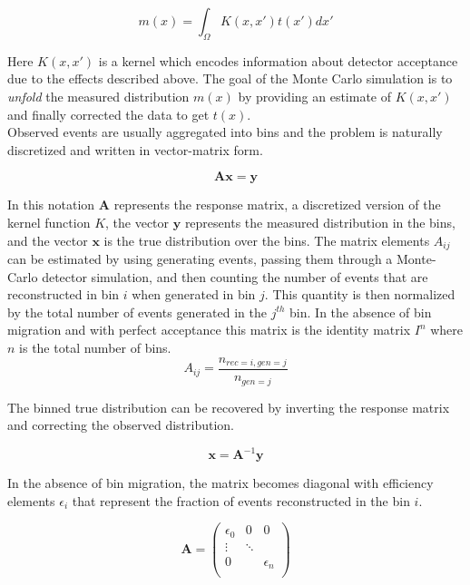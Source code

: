\begin{equation}
	m(x) = \int_{\Omega} K(x,x') t(x') dx'
\end{equation}
    
Here $K(x,x')$ is a kernel which encodes information about detector acceptance due to the effects described above.  The goal of the Monte Carlo simulation is to \textit{unfold} the measured distribution $m(x)$ by providing an estimate of $K(x,x')$ and finally corrected the data to get $t(x)$.\\
Observed events are usually aggregated into bins and the problem is naturally discretized and written in vector-matrix form.

\begin{equation}
	\mathbf{A} \mathbf{x} = \mathbf{y}
\end{equation}        

In this notation $\mathbf{A}$ represents the response matrix, a discretized version of the kernel function $K$, the vector $\mathbf{y}$ represents the measured distribution in the bins, and the vector $\mathbf{x}$ is the true distribution over the bins.  The matrix elements $A_{ij}$ can be estimated by using generating events, passing them through a Monte-Carlo detector simulation, and then counting the number of events that are reconstructed in bin $i$ when generated in bin $j$.  This quantity is then normalized by the total number of events generated in the $j^{th}$ bin.  In the absence of bin migration and with perfect acceptance this matrix is the identity matrix $I^{n}$ where $n$ is the total number of bins. \\

\begin{equation}
  A_{ij} = \frac{n_{rec=i, gen=j}}{n_{gen=j}}
\end{equation}

The binned true distribution can be recovered by inverting the response matrix and correcting the observed distribution.

\begin{equation}
  \mathbf{x} = \mathbf{A}^{-1} \mathbf{y} 
\end{equation}

In the absence of bin migration, the matrix becomes diagonal with efficiency elements $\epsilon_i$ that represent the fraction of events reconstructed in the bin $i$.

\begin{equation}
  \mathbf{A} = \begin{pmatrix}
    \epsilon_0 & 0 & 0\\
    \vdots & \ddots \\
    0 &  & \epsilon_n \\
  \end{pmatrix}
\end{equation}



